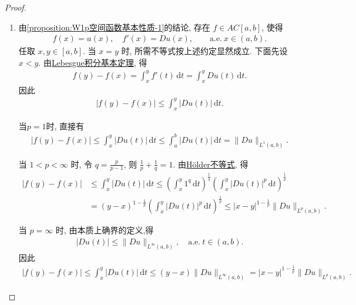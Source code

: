 \documentclass[../../main.tex]{subfiles}
\begin{document}
\begin{proof}
\begin{enumerate}[(1)]
\noindent$\mathbf{Step}\mathbf{3}.${\heiti 证明 $v+c$ 就是所求的 $f$.}

令
\begin{align*}
f(x)\triangleq v(x)+c,\qquad x\in[a,b].
\end{align*}
则 $f\in AC[a,b]$, 且
\begin{align*}
u(x)=f(x),\quad
f'(x)=v'(x)=Du(x),\qquad
\mathrm{a.e.}\ x\in(a,b).
\end{align*}
因此 $u$ 几乎处处等于绝对连续函数 $f$, 而 $f$ 的导数几乎处处存在, 等于 $u$ 的弱导数, 并且属于 $L^p(a,b)$.

\item 由\ref{proposition:W1p空间函数基本性质-1}的结论, 存在 $f\in AC[a,b]$, 使得
\begin{align*}
f(x)=u(x),\quad
f'(x)=Du(x),\qquad
\mathrm{a.e.}\ x\in(a,b).
\end{align*}
任取 $x,y\in[a,b]$. 当 $x=y$ 时, 所需不等式按上述约定显然成立. 下面先设 $x<y$. 由\hyperref[Real Analysis-theorem:Lebesgue积分基本定理]{Lebesgue积分基本定理}, 得
\begin{align*}
f(y)-f(x)
=\int_x^yf'(t)\,\mathrm{d}t
=\int_x^yDu(t)\,\mathrm{d}t.
\end{align*}
因此
\begin{align*}
|f(y)-f(x)|
\leqslant\int_x^y|Du(t)|\,\mathrm{d}t.
\end{align*}

当$p=1$时, 直接有
\begin{align*}
|f(y)-f(x)|
\leqslant\int_x^y|Du(t)|\,\mathrm{d}t
\leqslant\int_a^b|Du(t)|\,\mathrm{d}t
=\|Du\|_{L^1(a,b)}.
\end{align*}

当 $1<p<\infty$ 时, 令 $q=\frac{p}{p-1}$, 则 $\frac{1}{p}+\frac{1}{q}=1$. 由\hyperref[Real Analysis-theorem:实变函数--Hölder不等式]{Hölder不等式}, 得
\begin{align*}
|f(y)-f(x)|
&\leqslant\int_x^y|Du(t)|\,\mathrm{d}t\leqslant
\left(\int_x^y1^q\,\mathrm{d}t\right)^{\frac{1}{q}}
\left(\int_x^y|Du(t)|^p\,\mathrm{d}t\right)^{\frac{1}{p}}\\
&=(y-x)^{1-\frac{1}{p}}
\left(\int_x^y|Du(t)|^p\,\mathrm{d}t\right)^{\frac{1}{p}}\leqslant
|x-y|^{1-\frac{1}{p}}\|Du\|_{L^p(a,b)}.
\end{align*}

当 $p=\infty$ 时, 由本质上确界的定义,得
\begin{align*}
|Du(t)|\leqslant\|Du\|_{L^\infty(a,b)},\quad
\mathrm{a.e.}\ t\in(a,b).
\end{align*}
因此
\begin{align*}
|f(y)-f(x)|
\leqslant\int_x^y|Du(t)|\,\mathrm{d}t
\leqslant(y-x)\|Du\|_{L^\infty(a,b)}
=|x-y|^{1-\frac{1}{p}}\|Du\|_{L^p(a,b)}.
\end{align*}


\end{enumerate}
\end{proof}
\end{document}
